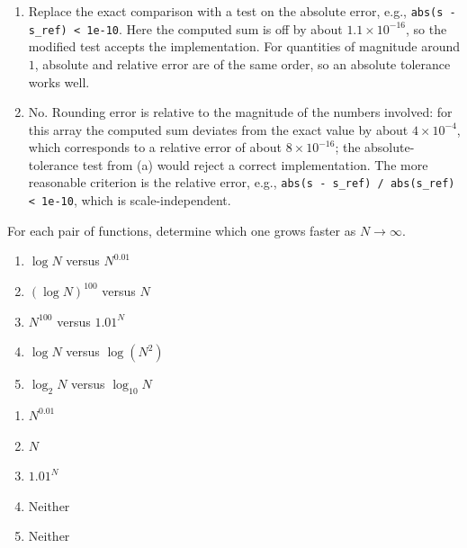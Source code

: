 \begin{solution}
    \begin{enumerate}[label=(\alph*)]
        \item Replace the exact comparison with a test on the absolute error, e.g., \texttt{abs(s - s\_ref) < 1e-10}. Here the computed sum is off by about $1.1 \times 10^{-16}$, so the modified test accepts the implementation. For quantities of magnitude around $1$, absolute and relative error are of the same order, so an absolute tolerance works well.
        \item No. Rounding error is relative to the magnitude of the numbers involved: for this array the computed sum deviates from the exact value by about $4 \times 10^{-4}$, which corresponds to a relative error of about $8 \times 10^{-16}$; the absolute-tolerance test from (a) would reject a correct implementation. The more reasonable criterion is the relative error, e.g., \texttt{abs(s - s\_ref) / abs(s\_ref) < 1e-10}, which is scale-independent.
    \end{enumerate}
\end{solution}

\begin{exercise}
    For each pair of functions, determine which one grows faster as $N \to \infty$.
    \begin{enumerate}[label=(\alph*)]
        \item $\log N$ versus $N^{0.01}$
        \item $(\log N)^{100}$ versus $N$
        \item $N^{100}$ versus $1.01^N$
        \item $\log N$ versus $\log(N^2)$
        \item $\log_2 N$ versus $\log_{10} N$
    \end{enumerate}
\end{exercise}

\begin{solution}
    \begin{enumerate}[label=(\alph*)]
        \item $N^{0.01}$
        \item $N$
        \item $1.01^N$
        \item Neither
        \item Neither
    \end{enumerate}
\end{solution}

